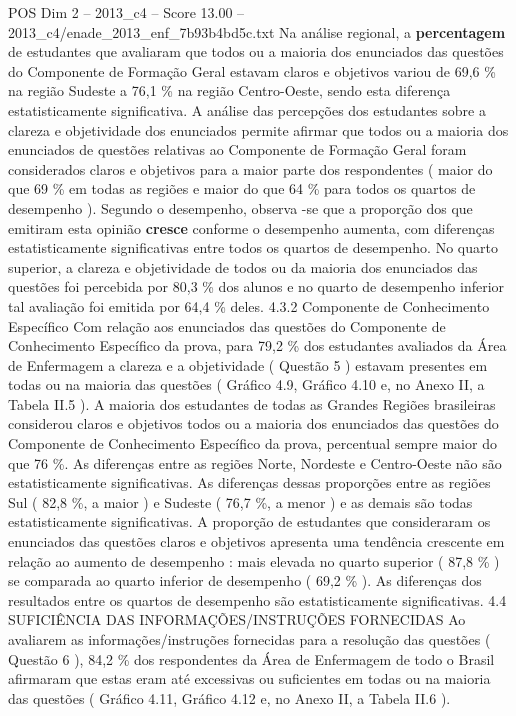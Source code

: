 \begin{textsample}{POS Dim 2 – 2013\_c4 – Score 13.00 – 2013\_c4/enade\_2013\_enf\_7b93b4bd5c.txt}
Na análise regional, a \textbf{percentagem} de estudantes que avaliaram que todos ou a maioria dos enunciados das questões do Componente de Formação Geral estavam claros e objetivos variou de 69,6 \% na região Sudeste a 76,1 \% na região Centro-Oeste, sendo esta diferença estatisticamente significativa.
A análise das percepções dos estudantes sobre a clareza e objetividade dos enunciados permite afirmar que todos ou a maioria dos enunciados de questões relativas ao Componente de Formação Geral foram considerados claros e objetivos para a maior parte dos respondentes ( maior do que 69 \% em todas as regiões e maior do que 64 \% para todos os quartos de desempenho ).
Segundo o desempenho, observa -se que a proporção dos que emitiram esta opinião \textbf{cresce} conforme o desempenho aumenta, com diferenças estatisticamente significativas entre todos os quartos de desempenho.
No quarto superior, a clareza e objetividade de todos ou da maioria dos enunciados das questões foi percebida por 80,3 \% dos alunos e no quarto de desempenho inferior tal avaliação foi emitida por 64,4 \% deles. 4.3.2 Componente de Conhecimento Específico Com relação aos enunciados das questões do Componente de Conhecimento Específico da prova, para 79,2 \% dos estudantes avaliados da Área de Enfermagem a clareza e a objetividade ( Questão 5 ) estavam presentes em todas ou na maioria das questões ( Gráfico 4.9, Gráfico 4.10 e, no Anexo II, a Tabela II.5 ).
A maioria dos estudantes de todas as Grandes Regiões brasileiras considerou claros e objetivos todos ou a maioria dos enunciados das questões do Componente de Conhecimento Específico da prova, percentual sempre maior do que 76 \%.
As diferenças entre as regiões Norte, Nordeste e Centro-Oeste não são estatisticamente significativas.
As diferenças dessas proporções entre as regiões Sul ( 82,8 \%, a maior ) e Sudeste ( 76,7 \%, a menor ) e as demais são todas estatisticamente significativas.
A proporção de estudantes que consideraram os enunciados das questões claros e objetivos apresenta uma tendência crescente em relação ao aumento de desempenho : mais elevada no quarto superior ( 87,8 \% ) se comparada ao quarto inferior de desempenho ( 69,2 \% ).
As diferenças dos resultados entre os quartos de desempenho são estatisticamente significativas. 4.4 SUFICIÊNCIA DAS INFORMAÇÕES/INSTRUÇÕES FORNECIDAS Ao avaliarem as informações/instruções fornecidas para a resolução das questões ( Questão 6 ), 84,2 \% dos respondentes da Área de Enfermagem de todo o Brasil afirmaram que estas eram até excessivas ou suficientes em todas ou na maioria das questões ( Gráfico 4.11, Gráfico 4.12 e, no Anexo II, a Tabela II.6 ).

\end{textsample}
